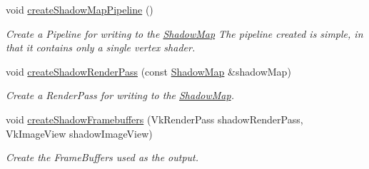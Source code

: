 \begin{DoxyCompactItemize}
\mbox{\label{class_render_system_a45fd2d41cf272efb8da347375876f709}} 
void \mbox{\hyperlink{class_render_system_a45fd2d41cf272efb8da347375876f709}{create\+Shadow\+Map\+Pipeline}} ()
\begin{DoxyCompactList}\small\item\em Create a Pipeline for writing to the \mbox{\hyperlink{struct_shadow_map}{Shadow\+Map}} The pipeline created is simple, in that it contains only a single vertex shader. \end{DoxyCompactList}\item 
void \mbox{\hyperlink{class_render_system_a6c7bcbc69bc3e34c5cccd42a5a1ddf91}{create\+Shadow\+Render\+Pass}} (const \mbox{\hyperlink{struct_shadow_map}{Shadow\+Map}} \&shadow\+Map)
\begin{DoxyCompactList}\small\item\em Create a Render\+Pass for writing to the \mbox{\hyperlink{struct_shadow_map}{Shadow\+Map}}. \end{DoxyCompactList}\item 
void \mbox{\hyperlink{class_render_system_a6c31fab93f511b2103917679ccc52f6d}{create\+Shadow\+Framebuffers}} (Vk\+Render\+Pass shadow\+Render\+Pass, Vk\+Image\+View shadow\+Image\+View)
\begin{DoxyCompactList}\small\item\em Create the Frame\+Buffers used as the output. \end{DoxyCompactList}\end{DoxyCompactItemize}
